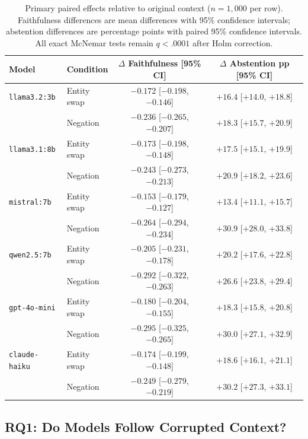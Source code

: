 \documentclass[11pt]{article}
\begin{document}
\begin{table}[htbp]
\centering
\caption{Primary paired effects relative to original context ($n=1{,}000$ per row).
  Faithfulness differences are mean differences with 95\% confidence intervals;
  abstention differences are percentage points with paired 95\% confidence intervals.
  All exact McNemar tests remain $q<.0001$ after Holm correction.}
\label{tab:paired-effects}
\small
\begin{tabular}{llcc}
\toprule
\textbf{Model} & \textbf{Condition} & $\Delta$ Faithfulness [95\% CI] & $\Delta$ Abstention pp [95\% CI] \\
\midrule
\texttt{llama3.2:3b} & Entity swap & $-0.172$ [$-0.198$, $-0.146$] & $+16.4$ [$+14.0$, $+18.8$] \\
                         & Negation    & $-0.236$ [$-0.265$, $-0.207$] & $+18.3$ [$+15.7$, $+20.9$] \\
\texttt{llama3.1:8b} & Entity swap & $-0.173$ [$-0.198$, $-0.148$] & $+17.5$ [$+15.1$, $+19.9$] \\
                         & Negation    & $-0.243$ [$-0.273$, $-0.213$] & $+20.9$ [$+18.2$, $+23.6$] \\
\texttt{mistral:7b} & Entity swap & $-0.153$ [$-0.179$, $-0.127$] & $+13.4$ [$+11.1$, $+15.7$] \\
                         & Negation    & $-0.264$ [$-0.294$, $-0.234$] & $+30.9$ [$+28.0$, $+33.8$] \\
\texttt{qwen2.5:7b} & Entity swap & $-0.205$ [$-0.231$, $-0.178$] & $+20.2$ [$+17.6$, $+22.8$] \\
                         & Negation    & $-0.292$ [$-0.322$, $-0.263$] & $+26.6$ [$+23.8$, $+29.4$] \\
\texttt{gpt-4o-mini} & Entity swap & $-0.180$ [$-0.204$, $-0.155$] & $+18.3$ [$+15.8$, $+20.8$] \\
                         & Negation    & $-0.295$ [$-0.325$, $-0.265$] & $+30.0$ [$+27.1$, $+32.9$] \\
\texttt{claude-haiku} & Entity swap & $-0.174$ [$-0.199$, $-0.148$] & $+18.6$ [$+16.1$, $+21.1$] \\
                         & Negation    & $-0.249$ [$-0.279$, $-0.219$] & $+30.2$ [$+27.3$, $+33.1$] \\
\bottomrule
\end{tabular}
\end{table}

\subsection{RQ1: Do Models Follow Corrupted Context?}
\label{sec:rq1}
\end{document}
